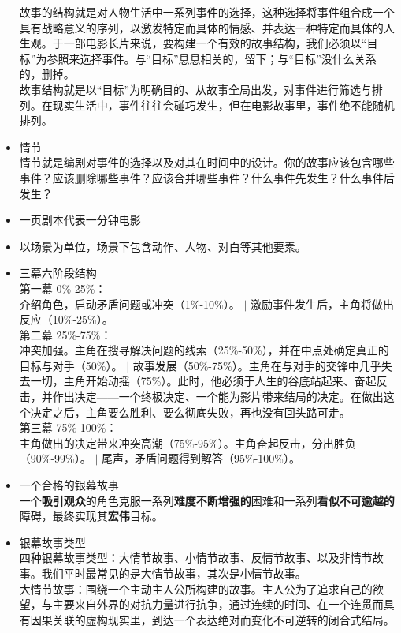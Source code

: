 \documentclass[UTF8,9pt]{ctexart}
\begin{document}
\begin{itemize}
    故事的结构就是对人物生活中一系列事件的选择，这种选择将事件组合成一个具有战略意义的序列，以激发特定而具体的情感、并表达一种特定而具体的人生观。于一部电影长片来说，要构建一个有效的故事结构，我们必须以“目标”为参照来选择事件。与“目标”息息相关的，留下；与“目标”没什么关系的，删掉。\\
    故事结构就是以“目标”为明确目的、从故事全局出发，对事件进行筛选与排列。在现实生活中，事件往往会碰巧发生，但在电影故事里，事件绝不能随机排列。
\item 情节\\
    情节就是编剧对事件的选择以及对其在时间中的设计。你的故事应该包含哪些事件？应该删除哪些事件？应该合并哪些事件？什么事件先发生？什么事件后发生？
\end{itemize}
\begin{itemize}
\item 一页剧本代表一分钟电影
\item 以场景为单位，场景下包含动作、人物、对白等其他要素。
\item 三幕六阶段结构\\
    第一幕  0\%-25\%：\\
    介绍角色，启动矛盾问题或冲突（1\%-10\%）。 $|$ 激励事件发生后，主角将做出反应（10\%-25\%）。\\
    第二幕 25\%-75\%： \\
    冲突加强。主角在搜寻解决问题的线索（25\%-50\%），并在中点处确定真正的目标与对手（50\%）。 $|$ 故事发展（50\%-75\%）。主角在与对手的交锋中几乎失去一切，主角开始动摇（75\%）。此时，他必须于人生的谷底站起来、奋起反击，并作出决定——一个终极决定、一个能为影片带来结局的决定。在做出这个决定之后，主角要么胜利、要么彻底失败，再也没有回头路可走。\\
    第三幕 75\%-100\%： \\
    主角做出的决定带来冲突高潮（75\%-95\%）。主角奋起反击，分出胜负（90\%-99\%）。 $|$ 尾声，矛盾问题得到解答（95\%-100\%）。
\item 一个合格的银幕故事\\
    一个{\bf 吸引观众}的角色克服一系列{\bf 难度不断增强的}困难和一系列{\bf 看似不可逾越的}障碍，最终实现其{\bf 宏伟}目标。
\item 银幕故事类型\\
    四种银幕故事类型：大情节故事、小情节故事、反情节故事、以及非情节故事。我们平时最常见的是大情节故事，其次是小情节故事。\\
    大情节故事：围绕一个主动主人公所构建的故事。主人公为了追求自己的欲望，与主要来自外界的对抗力量进行抗争，通过连续的时间、在一个连贯而具有因果关联的虚构现实里，到达一个表达绝对而变化不可逆转的闭合式结局。\\

\end{itemize}
\end{document}
